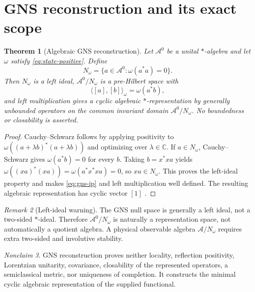 \documentclass[11pt,a4paper]{article}
\newtheorem{theorem}{Theorem}[section]
\theoremstyle{definition}
\theoremstyle{remark}
\newtheorem{remark}[theorem]{Remark}
\newcommand{\C}{\mathbb C}
\newcommand{\A}{\mathcal A}
\newtheorem{nonclaim}[theorem]{Nonclaim}
\newcommand{\Nw}{N_{\omega}}
\begin{document}
\section{GNS reconstruction and its exact scope}

\begin{theorem}[Algebraic GNS reconstruction]
Let $\A^0$ be a unital $*$-algebra and let $\omega$ satisfy
\eqref{eq:state-positive}.  Define
\begin{equation}
   \Nw=\{a\in\A^0:\omega(a^*a)=0\}.
   \label{eq:gns-null}
\end{equation}
Then $\Nw$ is a left ideal, $\A^0/\Nw$ is a pre-Hilbert space with
\begin{equation}
   \langle[a],[b]\rangle_\omega=\omega(a^*b),
   \label{eq:gns-ip}
\end{equation}
and left multiplication gives a cyclic algebraic $*$-representation by
generally unbounded operators on the common invariant domain
$\A^0/\Nw$.  No boundedness or closability is asserted.
\end{theorem}

\begin{proof}
Cauchy--Schwarz follows by applying positivity to
$\omega((a+\lambda b)^*(a+\lambda b))$ and optimizing over $\lambda\in\C$.
If $a\in\Nw$, Cauchy--Schwarz gives $\omega(a^*b)=0$ for every $b$.
Taking $b=x^*xa$ yields
$\omega((xa)^*(xa))=\omega(a^*x^*xa)=0$, so $xa\in\Nw$.
This proves the left-ideal property and makes \eqref{eq:gns-ip} and left
multiplication well defined.  The resulting algebraic representation has
cyclic vector $[1]$
\cite{GNS1943,Segal1947}.
\end{proof}

\begin{remark}[Left-ideal warning]
The GNS null space is generally a left ideal, not a two-sided $*$-ideal.
Therefore $\A^0/\Nw$ is naturally a representation space, not automatically a
quotient algebra.  A physical observable algebra $\A/\Nw$ requires extra
two-sided and involutive stability.
\end{remark}

\begin{nonclaim}
GNS reconstruction proves neither locality, reflection positivity, Lorentzian
unitarity, covariance, closability of the represented operators, a
semiclassical metric, nor uniqueness of completion.  It constructs the minimal
cyclic algebraic representation of the supplied functional.
\end{nonclaim}
\end{document}
